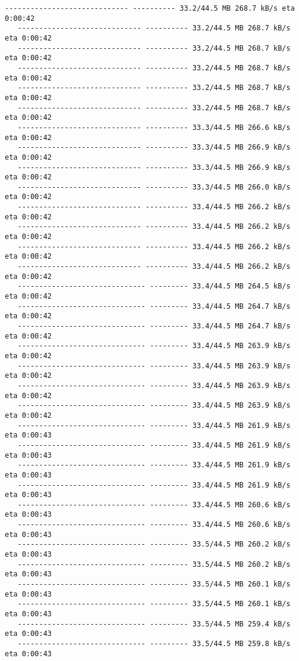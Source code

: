 \documentclass[11pt]{article}
\begin{document}
\begin{Verbatim}[commandchars=\\\{\}]
   ----------------------------- ---------- 33.2/44.5 MB 268.7 kB/s eta 0:00:42
   ----------------------------- ---------- 33.2/44.5 MB 268.7 kB/s eta 0:00:42
   ----------------------------- ---------- 33.2/44.5 MB 268.7 kB/s eta 0:00:42
   ----------------------------- ---------- 33.2/44.5 MB 268.7 kB/s eta 0:00:42
   ----------------------------- ---------- 33.2/44.5 MB 268.7 kB/s eta 0:00:42
   ----------------------------- ---------- 33.2/44.5 MB 268.7 kB/s eta 0:00:42
   ----------------------------- ---------- 33.3/44.5 MB 266.6 kB/s eta 0:00:42
   ----------------------------- ---------- 33.3/44.5 MB 266.9 kB/s eta 0:00:42
   ----------------------------- ---------- 33.3/44.5 MB 266.9 kB/s eta 0:00:42
   ----------------------------- ---------- 33.3/44.5 MB 266.0 kB/s eta 0:00:42
   ----------------------------- ---------- 33.4/44.5 MB 266.2 kB/s eta 0:00:42
   ----------------------------- ---------- 33.4/44.5 MB 266.2 kB/s eta 0:00:42
   ----------------------------- ---------- 33.4/44.5 MB 266.2 kB/s eta 0:00:42
   ----------------------------- ---------- 33.4/44.5 MB 266.2 kB/s eta 0:00:42
   ------------------------------ --------- 33.4/44.5 MB 264.5 kB/s eta 0:00:42
   ------------------------------ --------- 33.4/44.5 MB 264.7 kB/s eta 0:00:42
   ------------------------------ --------- 33.4/44.5 MB 264.7 kB/s eta 0:00:42
   ------------------------------ --------- 33.4/44.5 MB 263.9 kB/s eta 0:00:42
   ------------------------------ --------- 33.4/44.5 MB 263.9 kB/s eta 0:00:42
   ------------------------------ --------- 33.4/44.5 MB 263.9 kB/s eta 0:00:42
   ------------------------------ --------- 33.4/44.5 MB 263.9 kB/s eta 0:00:42
   ------------------------------ --------- 33.4/44.5 MB 261.9 kB/s eta 0:00:43
   ------------------------------ --------- 33.4/44.5 MB 261.9 kB/s eta 0:00:43
   ------------------------------ --------- 33.4/44.5 MB 261.9 kB/s eta 0:00:43
   ------------------------------ --------- 33.4/44.5 MB 261.9 kB/s eta 0:00:43
   ------------------------------ --------- 33.4/44.5 MB 260.6 kB/s eta 0:00:43
   ------------------------------ --------- 33.4/44.5 MB 260.6 kB/s eta 0:00:43
   ------------------------------ --------- 33.5/44.5 MB 260.2 kB/s eta 0:00:43
   ------------------------------ --------- 33.5/44.5 MB 260.2 kB/s eta 0:00:43
   ------------------------------ --------- 33.5/44.5 MB 260.1 kB/s eta 0:00:43
   ------------------------------ --------- 33.5/44.5 MB 260.1 kB/s eta 0:00:43
   ------------------------------ --------- 33.5/44.5 MB 259.4 kB/s eta 0:00:43
   ------------------------------ --------- 33.5/44.5 MB 259.8 kB/s eta 0:00:43

\end{Verbatim}
\end{document}
